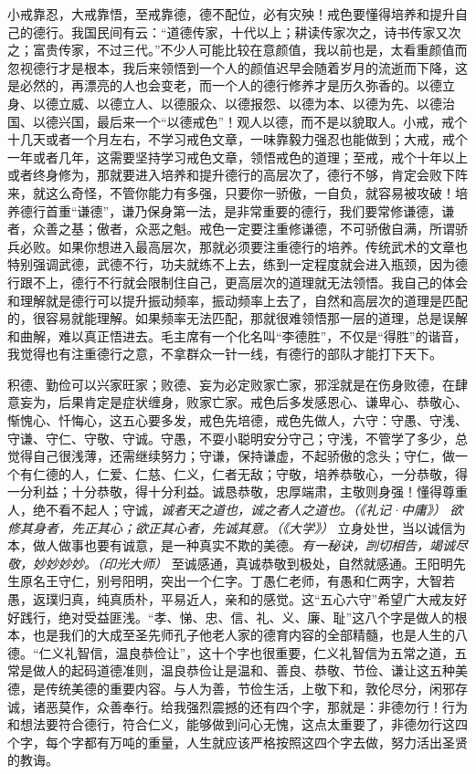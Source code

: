 小戒靠忍，大戒靠悟，至戒靠德，德不配位，必有灾殃！戒色要懂得培养和提升自己的德行。我国民间有云：“道德传家，十代以上；耕读传家次之，诗书传家又次之；富贵传家，不过三代。”不少人可能比较在意颜值，我以前也是，太看重颜值而忽视德行才是根本，我后来领悟到一个人的颜值迟早会随着岁月的流逝而下降，这是必然的，再漂亮的人也会变老，而一个人的德行修养才是历久弥香的。以德立身、以德立威、以德立人、以德服众、以德报怨、以德为本、以德为先、以德治国、以德兴国，最后来一个“以德戒色”！观人以德，而不是以貌取人。小戒，戒个十几天或者一个月左右，不学习戒色文章，一味靠毅力强忍也能做到；大戒，戒个一年或者几年，这需要坚持学习戒色文章，领悟戒色的道理；至戒，戒个十年以上或者终身修为，那就要进入培养和提升德行的高层次了，德行不够，肯定会败下阵来，就这么奇怪，不管你能力有多强，只要你一骄傲，一自负，就容易被攻破！培养德行首重“谦德”，谦乃保身第一法，是非常重要的德行，我们要常修谦德，谦者，众善之基；傲者，众恶之魁。戒色一定要注重修谦德，不可骄傲自满，所谓骄兵必败。如果你想进入最高层次，那就必须要注重德行的培养。传统武术的文章也特别强调武德，武德不行，功夫就练不上去，练到一定程度就会进入瓶颈，因为德行跟不上，德行不行就会限制住自己，更高层次的道理就无法领悟。我自己的体会和理解就是德行可以提升振动频率，振动频率上去了，自然和高层次的道理是匹配的，很容易就能理解。如果频率无法匹配，那就很难领悟那一层的道理，总是误解和曲解，难以真正悟进去。毛主席有一个化名叫“李德胜”，不仅是“得胜”的谐音，我觉得也有注重德行之意，不拿群众一针一线，有德行的部队才能打下天下。

积德、勤俭可以兴家旺家；败德、妄为必定败家亡家，邪淫就是在伤身败德，在肆意妄为，后果肯定是症状缠身，败家亡家。戒色后多发感恩心、谦卑心、恭敬心、惭愧心、忏悔心，这五心要多发，戒色先培德，戒色先做人，六守：守愚、守浅、守谦、守仁、守敬、守诚。守愚，不耍小聪明安分守己；守浅，不管学了多少，总觉得自己很浅薄，还需继续努力；守谦，保持谦虚，不起骄傲的念头；守仁，做一个有仁德的人，仁爱、仁慈、仁义，仁者无敌；守敬，培养恭敬心，一分恭敬，得一分利益；十分恭敬，得十分利益。诚恳恭敬，忠厚端肃，主敬则身强！懂得尊重人，绝不看不起人；守诚，\textit{诚者天之道也，诚之者人之道也。（《礼记·中庸》）} \textit{欲修其身者，先正其心；欲正其心者，先诚其意。（《大学》）} 立身处世，当以诚信为本，做人做事也要有诚意，是一种真实不欺的美德。\textit{有一秘诀，剀切相告，竭诚尽敬，妙妙妙妙。（印光大师）} 至诚感通，真诚恭敬到极处，自然就感通。王阳明先生原名王守仁，别号阳明，突出一个仁字。丁愚仁老师，有愚和仁两字，大智若愚，返璞归真，纯真质朴，平易近人，亲和的感觉。这“五心六守”希望广大戒友好好践行，绝对受益匪浅。“孝、悌、忠、信、礼、义、廉、耻”这八个字是做人的根本，也是我们的大成至圣先师孔子他老人家的德育内容的全部精髓，也是人生的八德。“仁义礼智信，温良恭俭让”，这十个字也很重要，仁义礼智信为五常之道，五常是做人的起码道德准则，温良恭俭让是温和、善良、恭敬、节俭、谦让这五种美德，是传统美德的重要内容。与人为善，节俭生活，上敬下和，敦伦尽分，闲邪存诚，诸恶莫作，众善奉行。给我强烈震撼的还有四个字，那就是：非德勿行！行为和想法要符合德行，符合仁义，能够做到问心无愧，这点太重要了，非德勿行这四个字，每个字都有万吨的重量，人生就应该严格按照这四个字去做，努力活出圣贤的教诲。

